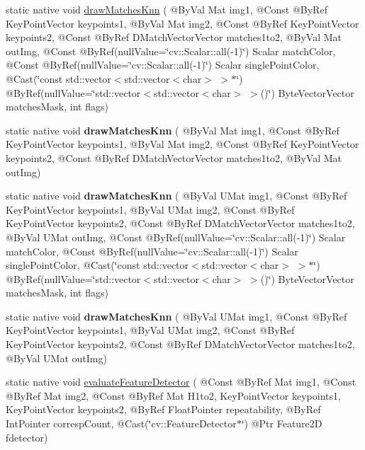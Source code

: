 \begin{DoxyCompactItemize}
\item 
static native void \hyperlink{group__features2d__draw_ga685267fdd3340d65fba4cf402d6dbe04}{draw\+Matches\+Knn} ( @By\+Val Mat img1, @Const @By\+Ref Key\+Point\+Vector keypoints1, @By\+Val Mat img2, @Const @By\+Ref Key\+Point\+Vector keypoints2, @Const @By\+Ref D\+Match\+Vector\+Vector matches1to2, @By\+Val Mat out\+Img, @Const @By\+Ref(null\+Value=\char`\"{}cv\+::\+Scalar\+::all(-\/1)\char`\"{}) Scalar match\+Color, @Const @By\+Ref(null\+Value=\char`\"{}cv\+::\+Scalar\+::all(-\/1)\char`\"{}) Scalar single\+Point\+Color, @Cast(\char`\"{}const std\+::vector$<$std\+::vector$<$char$>$ $>$$\ast$\char`\"{}) @By\+Ref(null\+Value=\char`\"{}std\+::vector$<$std\+::vector$<$char$>$ $>$()\char`\"{}) Byte\+Vector\+Vector matches\+Mask, int flags)
\item 
static native void {\bfseries draw\+Matches\+Knn} ( @By\+Val Mat img1, @Const @By\+Ref Key\+Point\+Vector keypoints1, @By\+Val Mat img2, @Const @By\+Ref Key\+Point\+Vector keypoints2, @Const @By\+Ref D\+Match\+Vector\+Vector matches1to2, @By\+Val Mat out\+Img)
\item 
static native void {\bfseries draw\+Matches\+Knn} ( @By\+Val U\+Mat img1, @Const @By\+Ref Key\+Point\+Vector keypoints1, @By\+Val U\+Mat img2, @Const @By\+Ref Key\+Point\+Vector keypoints2, @Const @By\+Ref D\+Match\+Vector\+Vector matches1to2, @By\+Val U\+Mat out\+Img, @Const @By\+Ref(null\+Value=\char`\"{}cv\+::\+Scalar\+::all(-\/1)\char`\"{}) Scalar match\+Color, @Const @By\+Ref(null\+Value=\char`\"{}cv\+::\+Scalar\+::all(-\/1)\char`\"{}) Scalar single\+Point\+Color, @Cast(\char`\"{}const std\+::vector$<$std\+::vector$<$char$>$ $>$$\ast$\char`\"{}) @By\+Ref(null\+Value=\char`\"{}std\+::vector$<$std\+::vector$<$char$>$ $>$()\char`\"{}) Byte\+Vector\+Vector matches\+Mask, int flags)
\item 
static native void {\bfseries draw\+Matches\+Knn} ( @By\+Val U\+Mat img1, @Const @By\+Ref Key\+Point\+Vector keypoints1, @By\+Val U\+Mat img2, @Const @By\+Ref Key\+Point\+Vector keypoints2, @Const @By\+Ref D\+Match\+Vector\+Vector matches1to2, @By\+Val U\+Mat out\+Img)
\item 
static native void \hyperlink{group__features2d_gaae7a705a66cbdd0ed99122fe183a0e03}{evaluate\+Feature\+Detector} ( @Const @By\+Ref Mat img1, @Const @By\+Ref Mat img2, @Const @By\+Ref Mat H1to2, Key\+Point\+Vector keypoints1, Key\+Point\+Vector keypoints2, @By\+Ref Float\+Pointer repeatability, @By\+Ref Int\+Pointer corresp\+Count, @Cast(\char`\"{}cv\+::\+Feature\+Detector$\ast$\char`\"{}) @Ptr Feature2D fdetector)

\end{DoxyCompactItemize}
